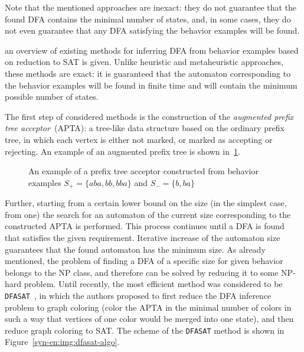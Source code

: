 Note that the mentioned approaches are inexact: they do not guarantee that the found DFA contains the minimal number of states, and, in some cases, they do not even guarantee that any DFA satisfying the behavior examples will be found.

\insectionen{\ref{sec:review:sat-dfa-inf}} an overview of existing methods for inferring DFA from behavior examples based on reduction to SAT is given. Unlike heuristic and metaheuristic approaches, these methods are exact: it is guaranteed that the automaton corresponding to the behavior examples will be found in finite time and will contain the minimum possible number of states.

The first step of considered methods is the construction of the \emph{augmented prefix tree acceptor}~(APTA): a tree-like data structure 
based on the ordinary prefix tree, in which each vertex is either not marked, or marked as accepting or rejecting.
An example of an augmented prefix tree is shown in~\ref{syn-en:img:apta-ex}.

\begin{figure}[ht]
  \centering
  \ifafour
    
  \else
    
  \fi
  \caption{An example of a prefix tree acceptor constructed from behavior examples $S_{+} = \{aba, bb, bba\}$ and $S_{-} = \{b, ba\}$}
  \label{syn-en:img:apta-ex}
\end{figure}

Further, starting from a certain lower bound on the size (in the simplest case, from one) the search for an automaton of the current size corresponding to the constructed APTA is performed.
This process continues until a DFA is found that satisfies the given requirement.
Iterative increase of the automaton size guarantees that the found automaton has the minimum size.
As already mentioned, the problem of finding a DFA of a specific size for given behavior belongs to the NP class, and therefore can be solved by reducing it to some NP-hard problem.
Until recently, the most efficient method was considered to be \texttt{DFASAT}~\cite{heule-icgi10}, in which the authors
proposed to first reduce the DFA inference problem to graph coloring (color the APTA in the minimal number of colors in such a way that vertices of one color would be merged into one state), and then reduce graph coloring to SAT.
The scheme of the \texttt{DFASAT} method is shown in Figure~\ref{syn-en:img:dfasat-algo}.

